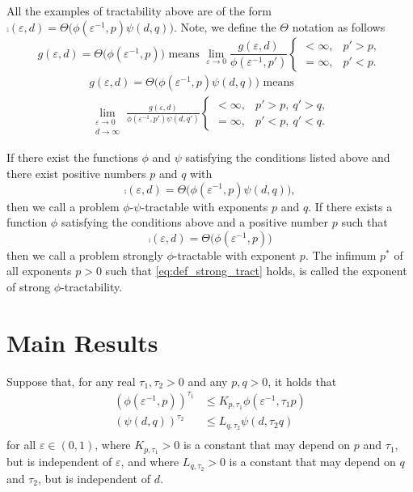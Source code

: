 \documentclass[11pt,a4paper]{article}
\begin{document}
All the examples of tractability above are of the form $\comp(\varepsilon, d) = \Theta \bigl( \phi(\varepsilon^{-1},p) \psi(d,q)\bigr)$.  
Note, we define the $\Theta$ notation as follows
\begin{equation*}
     g(\varepsilon,d) = \Theta\bigl(\phi(\varepsilon^{-1},p) \bigr) \text{ means } 
    \lim_{\varepsilon \to 0} \frac{g(\varepsilon,d)}{\phi(\varepsilon^{-1},p')}
           \begin{cases} < \infty, & p'> p,  \\ 
          =\infty, & p' < p.\end{cases}
\end{equation*}
\begin{multline*}
     g(\varepsilon,d) = \Theta\bigl(\phi(\varepsilon^{-1},p) \psi(d,q) \bigr) \text{ means } \\
    \lim_{\substack{\varepsilon \to 0 \\ d \to \infty}} \frac{g(\varepsilon,d)}{\phi(\varepsilon^{-1},p') \psi(d,q')}
          \begin{cases} < \infty, & p'> p, \  q' > q,  \\ 
          =\infty, & p' < p, \ q' < q.\end{cases}
\end{multline*}


\begin{definition}
If there exist the functions $\phi$ and $\psi$ satisfying the conditions listed above and there exist positive numbers $p$ and $q$ with
\[
\comp(\varepsilon, d)  = \Theta\bigl(\phi(\varepsilon^{-1},p) \psi(d,q) \bigr),
\]
then we call a problem $\phi$-$\psi$-tractable with exponents $p$ and $q$.  
If there exists a function $\phi$ satisfying the conditions above and a positive number $p$ such that 
\begin{equation}\label{eq:def_strong_tract}
\comp(\varepsilon, d)  = \Theta\bigl(\phi(\varepsilon^{-1},p) \bigr)
\end{equation}
then we call a problem strongly $\phi$-tractable with exponent $p$. The infimum $p^*$ of all exponents $p>0$ such that \eqref{eq:def_strong_tract} holds, 
is called the exponent of strong $\phi$-tractability. 
\end{definition}


\section{Main Results}
Suppose that, for any real $\tau_1, \tau_2>0$ and any $p,q>0$, it holds that
\begin{align*}
 (\phi(\varepsilon^{-1},p))^{\tau_1} &\le K_{p,\tau_1} \phi (\varepsilon^{-1},\tau_1 p)\\
  (\psi(d,q))^{\tau_2} &\le L_{q,\tau_2} \psi (d,\tau_2 q)\\
\end{align*}
for all $\varepsilon\in (0,1)$, where $K_{p,\tau_1}>0$ is a constant that may depend on $p$ and $\tau_1$, but is independent of $\varepsilon$, 
and where $L_{q,\tau_2}>0$ is a constant that may depend on $q$ and $\tau_2$, but is independent of $d$.
\end{document}

